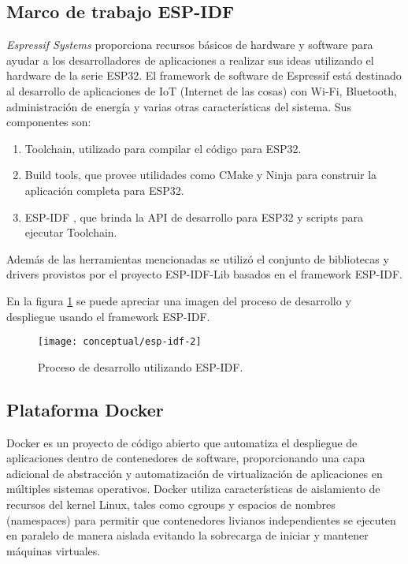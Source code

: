 \subsection{Marco de trabajo ESP-IDF}

\textit{Espressif Systems} proporciona recursos básicos de hardware y software para ayudar a los desarrolladores de aplicaciones a realizar sus ideas utilizando el hardware de la serie ESP32. El framework de software de Espressif está destinado al desarrollo de aplicaciones de IoT (Internet de las cosas) con Wi-Fi, Bluetooth, administración de energía y varias otras características del sistema.
Sus componentes son:
\begin{enumerate}
	\item Toolchain, utilizado para compilar el código para ESP32.
	\item Build tools, que provee utilidades como CMake \cite{cmake_website} y Ninja \cite{ninja_website} para construir la aplicación completa para ESP32.
	\item ESP-IDF \cite{ESPIDF_home}, que brinda la API de desarrollo para ESP32 y scripts para ejecutar Toolchain.
	
\end{enumerate}

Además de las herramientas mencionadas se utilizó el conjunto de bibliotecas y drivers provistos por el proyecto ESP-IDF-Lib \cite{esp_idf_lib_website} basados en el framework ESP-IDF.

En la figura \ref{fig:esp-idf} se puede apreciar una imagen del proceso de desarrollo y despliegue usando el framework ESP-IDF.

\begin{figure}[h]
  \centering
  \texttt{[image: conceptual/esp-idf-2]}
  \caption{Proceso de desarrollo utilizando ESP-IDF\protect\footnotemark.}
  \label{fig:esp-idf}
\end{figure}


\subsection{Plataforma Docker}

Docker \cite{docker_website} es un proyecto de código abierto que automatiza el despliegue de aplicaciones dentro de contenedores de software, proporcionando una capa adicional de abstracción y automatización de virtualización de aplicaciones en múltiples sistemas operativos. Docker utiliza características de aislamiento de recursos del kernel Linux, tales como cgroups y espacios de nombres (namespaces) para permitir que contenedores livianos independientes se ejecuten en paralelo de manera aislada evitando la sobrecarga de iniciar y mantener máquinas virtuales.

